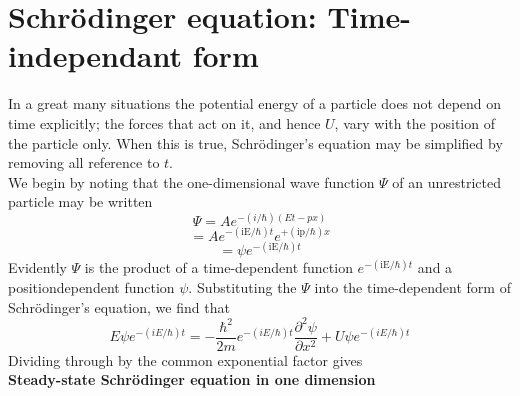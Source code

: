 \begin{center}
\end{center}
\section{Schrödinger equation: Time-independant form}
In a great many situations the potential energy of a particle does not depend on time explicitly; the forces that act on it, and hence $U$, vary with the position of the particle only. When this is true, Schrödinger's equation may be simplified by removing all reference to $t$.\\
We begin by noting that the one-dimensional wave function $\Psi$ of an unrestricted particle may be written\\
$$\Psi=A e^{-(i / \hbar)(E t-p x)}$$
$$=A e^{-(\mathrm{iE} / \hbar) t} e^{+(\mathrm{ip} / \hbar) x}$$
$$=\psi e^{-(\mathrm{iE} / \hbar) t}$$
Evidently $\Psi$ is the product of a time-dependent function $e^{-(\mathrm{iE} / \hbar) t}$ and a positiondependent function $\psi$. Substituting the $\Psi$  into the time-dependent form of Schrödinger's equation, we find that
$$E \psi e^{-(i E / \hbar) t}=-\frac{\hbar^{2}}{2 m} e^{-(i E / \hbar) t} \frac{\partial^{2} \psi}{\partial x^{2}}+U \psi e^{-(i E / \hbar) t}$$
Dividing through by the common exponential factor gives \\
\textbf{Steady-state
	Schrödinger equation in one dimension}\\
 \begin{center}
\end{center}

